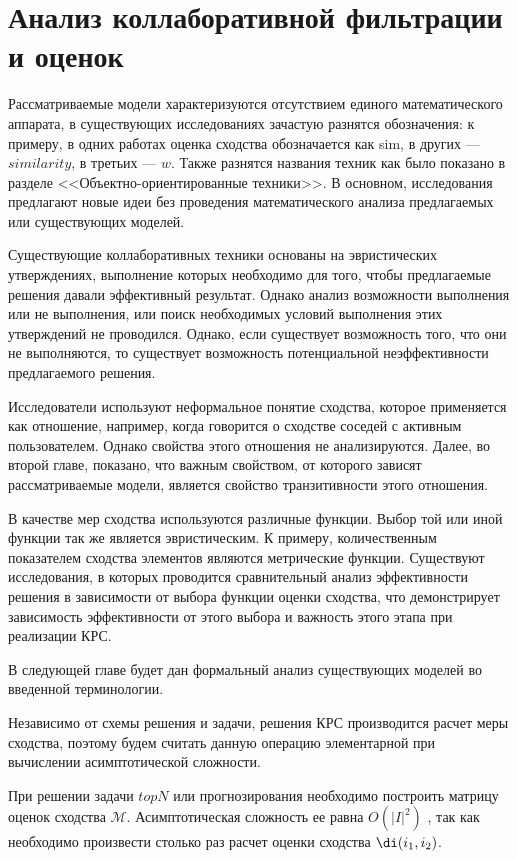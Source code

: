 \section{Анализ коллаборативной фильтрации и оценок}
Рассматриваемые модели характеризуются отсутствием единого математического
аппарата, в существующих исследованиях зачастую разнятся обозначения:
к примеру, в одних работах оценка сходства обозначается как
sim\cite{item-based},
в других --- $similarity$\cite{amazon-item2item}, в третьих ---
$w$\cite{emperical-cf}. Также разнятся названия техник как было показано в
разделе <<Объектно-ориентированные техники>>.
В основном, исследования
предлагают новые идеи без проведения математического анализа предлагаемых
или существующих моделей.

Существующие коллаборативных техники основаны на эвристических утверждениях,
выполнение которых необходимо для того, чтобы предлагаемые решения давали
эффективный результат. Однако анализ возможности выполнения или не выполнения,
или поиск необходимых условий выполнения этих утверждений не проводился.
Однако, если
существует возможность того, что они не выполняются, то существует возможность
потенциальной неэффективности предлагаемого
решения.

Исследователи используют неформальное понятие сходства, которое
применяется как отношение, например, когда говорится о сходстве соседей с
активным пользователем.
Однако свойства
этого отношения не анализируются. Далее, во второй главе, показано, что важным свойством, от которого 
зависят рассматриваемые модели, является свойство транзитивности этого отношения.  

В качестве мер сходства используются различные функции. Выбор той или иной функции так же является эвристическим.
К примеру, количественным показателем сходства элементов являются метрические функции\cite{fdca}. Существуют исследования, 
в которых проводится сравнительный анализ эффективности решения в зависимости от выбора функции оценки сходства\cite{content_rs_soc_sys}, 
что демонстрирует зависимость эффективности от этого выбора и важность этого этапа при реализации КРС.

В следующей главе будет дан формальный анализ существующих моделей во введенной терминологии.

Независимо от схемы решения и задачи, решения КРС производится расчет
меры сходства,
поэтому будем считать данную операцию элементарной при вычислении асимптотической сложности. 

При решении задачи $topN$ или прогнозирования необходимо построить матрицу оценок сходства $\mathcal{M}$. Асимптотическая
сложность ее равна $O(|I|^2)$ \cite{amazon-item2item}, так как необходимо произвести столько раз расчет оценки сходства
 $\di(i_1,i_2)$.

